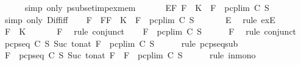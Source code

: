 \begin{isabellebody}
\ \ \ \ \isamarkupfalse%
\ {\isacharparenleft}simp\ only{\isacharcolon}\ psubset{\isacharunderscore}imp{\isacharunderscore}ex{\isacharunderscore}mem{\isacharparenright}\ \isanewline
\ \ \isamarkupfalse%
\ \isamarkupfalse%
\ E{\isacharcolon}{\isachardoublequoteopen}{\isasymexists}F{\isachardot}\ F\ {\isasymin}\ K\ {\isasymand}\ F\ {\isasymnotin}\ {\isacharparenleft}pcp{\isacharunderscore}lim\ C\ S{\isacharparenright}{\isachardoublequoteclose}\isanewline
\ \ \ \ \isamarkupfalse%
\ {\isacharparenleft}simp\ only{\isacharcolon}\ Diff{\isacharunderscore}iff{\isacharparenright}\isanewline
\ \ \isamarkupfalse%
\ F\ \ F{\isacharcolon}{\isachardoublequoteopen}F\ {\isasymin}\ K\ {\isasymand}\ F\ {\isasymnotin}\ pcp{\isacharunderscore}lim\ C\ S{\isachardoublequoteclose}\ \isanewline
\ \ \ \ \isamarkupfalse%
\ E\ \isamarkupfalse%
\ {\isacharparenleft}rule\ exE{\isacharparenright}\isanewline
\ \ \isamarkupfalse%
\ {\isachardoublequoteopen}F\ {\isasymin}\ K{\isachardoublequoteclose}\ \isanewline
\ \ \ \ \isamarkupfalse%
\ F\ \isamarkupfalse%
\ {\isacharparenleft}rule\ conjunct{}{\isacharparenright}\isanewline
\ \ \isamarkupfalse%
\ {\isachardoublequoteopen}F\ {\isasymnotin}\ pcp{\isacharunderscore}lim\ C\ S{\isachardoublequoteclose}\isanewline
\ \ \ \ \isamarkupfalse%
\ F\ \isamarkupfalse%
\ {\isacharparenleft}rule\ conjunct{}{\isacharparenright}\isanewline
\ \ \isamarkupfalse%
\ {\isachardoublequoteopen}pcp{\isacharunderscore}seq\ C\ S\ {\isacharparenleft}Suc\ {\isacharparenleft}to{\isacharunderscore}nat\ F{\isacharparenright}{\isacharparenright}\ {\isasymsubseteq}\ pcp{\isacharunderscore}lim\ C\ S{\isachardoublequoteclose}\isanewline
\ \ \ \ \isamarkupfalse%
\ {\isacharparenleft}rule\ pcp{\isacharunderscore}seq{\isacharunderscore}sub{\isacharparenright}\isanewline
\ \ \isamarkupfalse%
\ \isamarkupfalse%
\ {\isachardoublequoteopen}F\ {\isasymin}\ pcp{\isacharunderscore}seq\ C\ S\ {\isacharparenleft}Suc\ {\isacharparenleft}to{\isacharunderscore}nat\ F{\isacharparenright}{\isacharparenright}\ {\isasymlongrightarrow}\ F\ {\isasymin}\ pcp{\isacharunderscore}lim\ C\ S{\isachardoublequoteclose}\isanewline
\ \ \ \ \isamarkupfalse%
\ {\isacharparenleft}rule\ in{\isacharunderscore}mono{\isacharparenright}\isanewline
\ \ \isamarkupfalse%

\end{isabellebody}
